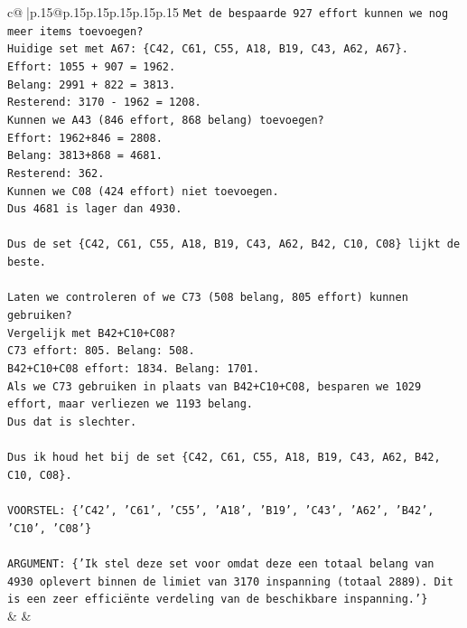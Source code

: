 \documentclass{article}
\begin{document}
{\begin{supertabular}{c@{$\;$}|p{.15\linewidth}@{}p{.15\linewidth}p{.15\linewidth}p{.15\linewidth}p{.15\linewidth}p{.15\linewidth}}
{{{\texttt{Met de bespaarde 927 effort kunnen we nog meer items toevoegen?} \\
\texttt{Huidige set met A67: \{C42, C61, C55, A18, B19, C43, A62, A67\}.} \\
\texttt{Effort: 1055 + 907 = 1962.} \\
\texttt{Belang: 2991 + 822 = 3813.} \\
\texttt{Resterend: 3170 {-} 1962 = 1208.} \\
\texttt{Kunnen we A43 (846 effort, 868 belang) toevoegen?} \\
\texttt{Effort: 1962+846 = 2808.} \\
\texttt{Belang: 3813+868 = 4681.} \\
\texttt{Resterend: 362.} \\
\texttt{Kunnen we C08 (424 effort) niet toevoegen.} \\
\texttt{Dus 4681 is lager dan 4930.} \\
\\ 
\texttt{Dus de set \{C42, C61, C55, A18, B19, C43, A62, B42, C10, C08\} lijkt de beste.} \\
\\ 
\texttt{Laten we controleren of we C73 (508 belang, 805 effort) kunnen gebruiken?} \\
\texttt{Vergelijk met B42+C10+C08?} \\
\texttt{C73 effort: 805. Belang: 508.} \\
\texttt{B42+C10+C08 effort: 1834. Belang: 1701.} \\
\texttt{Als we C73 gebruiken in plaats van B42+C10+C08, besparen we 1029 effort, maar verliezen we 1193 belang.} \\
\texttt{Dus dat is slechter.} \\
\\ 
\texttt{Dus ik houd het bij de set \{C42, C61, C55, A18, B19, C43, A62, B42, C10, C08\}.} \\
\\ 
\texttt{VOORSTEL: \{'C42', 'C61', 'C55', 'A18', 'B19', 'C43', 'A62', 'B42', 'C10', 'C08'\}} \\
\\ 
\texttt{ARGUMENT: \{'Ik stel deze set voor omdat deze een totaal belang van 4930 oplevert binnen de limiet van 3170 inspanning (totaal 2889). Dit is een zeer efficiënte verdeling van de beschikbare inspanning.'\}} \\
            }
        }
    }
    & & \\ \\


\end{supertabular}}
\end{document}
